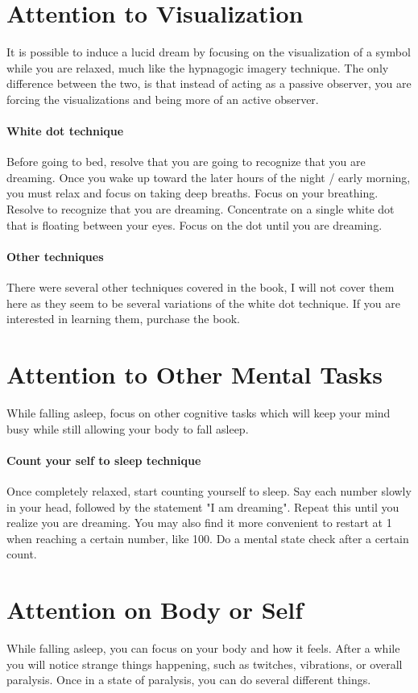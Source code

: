 \documentclass{book}
\begin{document}
\section{Attention to Visualization}
It is possible to induce a lucid dream by focusing on the visualization of a symbol while you are relaxed, much like the hypnagogic imagery technique. The only difference between the two, is that instead of acting as a passive observer, you are forcing the visualizations and being more of an active observer.

\paragraph{White dot technique} Before going to bed, resolve that you are going to recognize that you are dreaming. Once you wake up toward the later hours of the night / early morning, you must relax and focus on taking deep breaths. Focus on your breathing. Resolve to recognize that you are dreaming. Concentrate on a single white dot that is floating between your eyes. Focus on the dot until you are dreaming. 


\paragraph{Other techniques} There were several other techniques covered in the book, I will not cover them here as they seem to be several variations of the white dot technique. If you are interested in learning them, purchase the book.

\section{Attention to Other Mental Tasks}
While falling asleep, focus on other cognitive tasks which will keep your mind busy while still allowing your body to fall asleep. 

\paragraph{Count your self to sleep technique}
Once completely relaxed, start counting yourself to sleep. Say each number slowly in your head, followed by the statement "I am dreaming". Repeat this until you realize you are dreaming. You may also find it more convenient to restart at 1 when reaching a certain number, like 100. Do a mental state check after a certain count. 

\section{Attention on Body or Self}
While falling asleep, you can focus on your body and how it feels. After a while you will notice strange things happening, such as twitches, vibrations, or overall paralysis. Once in a state of paralysis, you can do several different things.
\end{document}
